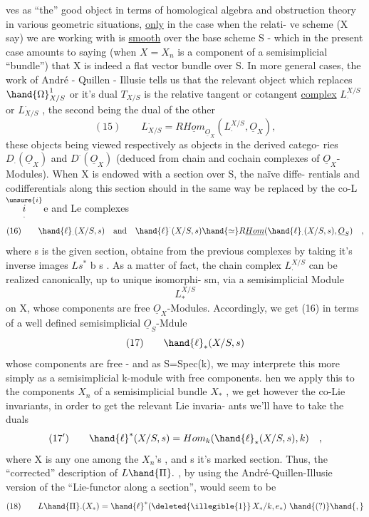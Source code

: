 
ves as ``the'' good object in terms of homological algebra and obstruction
theory in various geometric situations, \uline{only} in the case when the relati-%
ve scheme (X say) we are working with is \uline{smooth} over the base scheme S
- which in the present case amounts to saying (when $X=X_n$ is a component
of a semisimplicial ``bundle'') that X  is indeed a flat vector bundle
over S. In more general cases, the work of André - Quillen - Illusie
tells us that the relevant object which replaces $\hand{\Omega}^1_{X/S}$ or it's dual $T_{X/S}$
is the relative tangent or cotangent \uline{complex} $L_\cdot^{X/S}$ or $L^\cdot_{X/S}$ , the second
being the dual of the other
\[ (15) \qquad L^\cdot_{X/S} = R\underline{Hom}_{\underline{O}_X}(L_\cdot^{X/S} , \underline{O}_X) , \]
these objects being viewed respectively as objects in the derived catego-%
ries $D_\cdot(\underline{O}_X)$ and $D^\cdot(\underline{O}_X)$ (deduced from chain and cochain complexes of
$\underline{O}_X$-Modules). When X is endowed with a section over S, the naïve diffe-%
rentials and codifferentials along this section should in the same way
be replaced by the co-L$\overset{\unsure{i}}{\underset{.}{i}}$e and Le complexes
\[ (16) \qquad \hand{\ell}_\cdot(X/S,s) \quad\text{and}\quad \hand{\ell}^\cdot(X/S,s) \hand{\simeq} R\underline{Hom}(\hand{\ell}_\cdot(X/S,s), \underline{O}_S) \quad , \]
where s is the given section, obtaine from the previous complexes
by taking it's inverse images $Ls^*$ b s . As a matter of fact, the
chain complex $L_\cdot^{X/S}$ can be realized canonically, up to unique isomorphi-%
sm, via a semisimplicial Module
\[ L_*^{X/S} \]
on X, whose components are free $\underline{O}_X$-Modules. Accordingly, we get
(16) in terms of a well defined semisimplicial $\underline{O}_S$-Mdule 
\[ (17) \qquad \hand{\ell}_*(X/S,s) \]
whose components are free - and as S=Spec(k), we may interprete this
more simply as a semisimplicial k-module with free components. hen we
apply this to the components $X_n$ of a semisimplicial bundle $X_*$ , we get
however the co-Lie invariants, in order to get the relevant Lie invaria-%
ants we'll have to take the duals
\[ (17') \qquad \hand{\ell}^*(X/S,s) = Hom_k(\hand{\ell}_*(X/S,s),k) \quad , \]
where X is any one among the $X_n$'s , and s it's marked section. Thus,
the ``corrected'' description of $L\hand{\Pi}.$ , by using the André-Quillen-Illusie
version of the ``Lie\hand{\unsure{$^*$}}-functor along a section'', would seem to be
\[ (18) \qquad L\hand{\Pi}.(X_*) = \hand{\ell}^*(\deleted{\illegible{1}}\, X_*/k , e_*) \ \hand{(?)}\hand{,} \]


